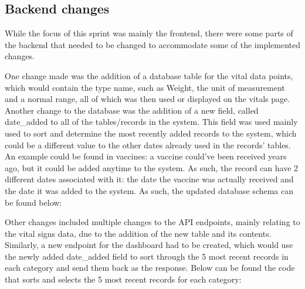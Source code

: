 \FloatBarrier{}

\subsection{Backend changes}

While the focus of this sprint was mainly the frontend, there were some parts of the backend that needed to be changed to accommodate some of the implemented changes. 

One change made was the addition of a database table for the vital data points, which would contain the type name, such as Weight, the unit of measurement and a normal range, all of which was then used or displayed on the vitals page. Another change to the database was the addition of a new field, called date\_added to all of the tables/records in the system. This field was used mainly used to sort and determine the most recently added records to the system, which could be a different value to the other dates already used in the records' tables. An example could be found in vaccines: a vaccine could've been received years ago, but it could be added anytime to the system. As such, the record can have 2 different dates associated with it: the date the vaccine was actually received and the date it was added to the system. As such, the updated database schema can be found below:

\noindent\begin{minipage}{\textwidth}
  \begin{center}
      \label{fig:erd_s3}
  \end{center}
\end{minipage}

Other changes included multiple changes to the API endpoints, mainly relating to the vital signs data, due to the addition of the new table and its contents. Similarly, a new endpoint for the dashboard had to be created, which would use the newly added date\_added field to sort through the 5 most recent records in each category and send them back as the response. Below can be found the code that sorts and selects the 5 most recent records for each category:

